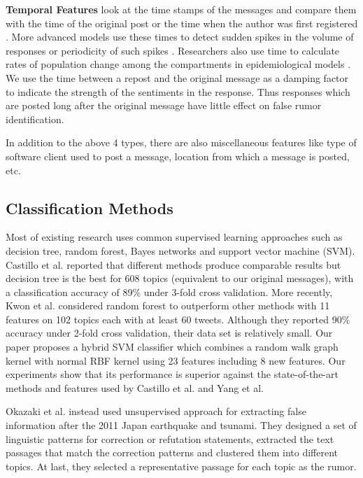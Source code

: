 {\bf Temporal Features} look at the time stamps of the messages and compare them
with the time of the original post or the time when the author
was first registered \cite{castillo2011information}.
More advanced models use these times to detect sudden
spikes in the volume of responses or periodicity of such spikes
\cite{KwonCJCW13}.
Researchers also use time to calculate rates of
population change among the compartments in epidemiological models
\cite{jin2013epidemiological,KwonCJCW13}.
We use the time between a repost and the original message as a damping
factor to indicate the strength of the sentiments in the response.
Thus responses which are posted long after the original message have little
effect on false rumor identification.


In addition to the above 4 types, there are also miscellaneous features like
type of software client used to post a message, location from which a message
is posted, etc.

\subsection{Classification Methods}
Most of existing research uses common supervised learning approaches such as
decision tree, random forest, Bayes networks and support vector machine (SVM).
Castillo et al. \cite{castillo2011information}
reported that different methods produce comparable results
but decision tree is the best for 608 topics
(equivalent to our original messages), with a classification
accuracy of 89\% under 3-fold cross validation. More recently,
Kwon et al. \cite{KwonCJCW13}
considered random forest to outperform other methods with 11 features on
102 topics each with at least 60 tweets. Although they reported 90\% accuracy
under 2-fold cross validation, their data set is relatively small.
Our paper proposes a hybrid SVM classifier which combines
a random walk graph kernel with normal RBF kernel using 23 features including
8 new features. Our experiments show that its performance is superior against
the state-of-the-art methods and features used by Castillo et al. and
Yang et al.

Okazaki et al.\cite{okazaki2013extracting} instead used unsupervised
approach for extracting false information after the 2011 Japan
earthquake and tsunami.
They designed a set of linguistic patterns for correction or refutation
statements, extracted the text passages that match the correction patterns
and clustered them into different topics. At last, they selected a
representative passage for each topic as the rumor.

